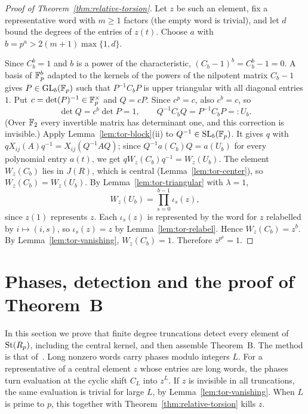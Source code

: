 \begin{proof}[Proof of Theorem~\ref{thm:relative-torsion}]
Let $z$ be such an element, fix a representative word with $m\geq1$ factors (the empty word is trivial), and let $d$
bound the degrees of the entries of $z(t)$. Choose $a$ with $b=p^a>2(m+1)\max\{1,d\}$.

Since $C_b^b=1$ and $b$ is a power of the characteristic, $(C_b-1)^b=C_b^b-1=0$. A basis of $\mathbb F_p^b$ adapted to the
kernels of the powers of the nilpotent matrix $C_b-1$ gives $P\in\operatorname{GL}_b(\mathbb F_p)$ such that $P^{-1}C_bP$ is upper triangular
with all diagonal entries $1$. Put $c=\det(P)^{-1}\in\mathbb F_p^\times$ and $Q=cP$. Since $c^p=c$, also $c^b=c$, so
\[
 \det Q=c^b\det P=1,\qquad Q^{-1}C_bQ=P^{-1}C_bP=:U_b.
\]
(Over $\mathbb F_2$ every invertible matrix has determinant one, and this correction is invisible.) Apply
Lemma~\ref{lem:tor-block}(ii) to $Q^{-1}\in\operatorname{SL}_b(\mathbb F_p)$. It gives $q$ with $qX_{ij}(A)q^{-1}=X_{ij}(Q^{-1}AQ)$; since
$Q^{-1}a(C_b)Q=a(U_b)$ for every polynomial entry $a(t)$, we get $qW_z(C_b)q^{-1}=W_z(U_b)$. The element $W_z(C_b)$ lies
in $J(R)$, which is central (Lemma~\ref{lem:tor-center}), so $W_z(C_b)=W_z(U_b)$. By Lemma~\ref{lem:tor-triangular} with
$\lambda=1$,
\[
 W_z(U_b)=\prod_{s=0}^{b-1}\iota_s(z),
\]
since $z(1)$ represents $z$. Each $\iota_s(z)$ is represented by the word for $z$ relabelled by $i\mapsto(i,s)$, so
$\iota_s(z)=z$ by Lemma~\ref{lem:tor-relabel}. Hence $W_z(C_b)=z^b$. By Lemma~\ref{lem:tor-vanishing}, $W_z(C_b)=1$.
Therefore $z^{p^a}=1$.
\end{proof}

\section{Phases, detection and the proof of Theorem~B}\label{sec:detection}

In this section we prove that finite degree truncations detect every element of $\operatorname{St}(R_p)$, including the central kernel,
and then assemble Theorem~B. The method is that of~\cite[Sections~2, 5, 6 and~8]{OAI247rf}. Long nonzero words carry
phases modulo integers $L$. For a representative of a central element $z$ whose entries are long words, the phases turn
evaluation at the cyclic shift $C_L$ into $z^L$. If $z$ is invisible in all truncations, the same evaluation is trivial
for large $L$, by Lemma~\ref{lem:tor-vanishing}. When $L$ is prime to $p$, this together with
Theorem~\ref{thm:relative-torsion} kills $z$.

